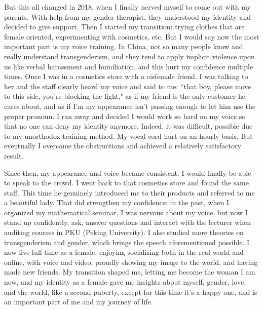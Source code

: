 \documentclass[10pt]{article}
\begin{document}
\begin{CJK*}{UTF8}{gbsn}
But this all changed in 2018, when I finally nerved myself to come out with my parents. With help from my gender therapist, they understood my identity and decided to give support. Then I started my transition: trying clothes that are female oriented, experimenting with cosmetics, etc. But I would say now the most important part is my voice training. In China, not so many people know and really understand transgenderism, and they tend to apply implicit violence upon us like verbal harassment and humiliation, and this hurt my confidence multiple times. Once I was in a cosmetics store with a cisfemale friend. I was talking to her and the staff clearly heard my voice and said to me: ``that boy, please move to this side, you're blocking the light," as if my friend is the only customer he cares about, and as if I'm my appearance isn't passing enough to let him use the proper pronoun. I ran away and decided I would work so hard on my voice so that no one can deny my identity anymore. Indeed, it was difficult, possible due to my unorthodox training method. My vocal cord hurt on an hourly basis. But eventually I overcame the obstructions and achieved a relatively satisfactory result.

Since then, my appearance and voice became consistent. I would finally be able to speak to the crowd. I went back to that cosmetics store and found the same staff. This time he genuinely introduced me to their products and referred to me a beautiful lady. That did strengthen my confidence: in the past, when I organized my mathematical seminar, I was nervous about my voice, but now I stand up confidently, ask, answer questions and interact with the lecturer when auditing courses in PKU (Peking University). I also studied more theories on transgenderism and gender, which brings the speech aforementioned possible. I now live full-time as a female, enjoying socializing both in the real world and online, with voice and video, proudly showing my image to the world, and having made new friends. My transition shaped me, letting me become the woman I am now, and my identity as a female gave me insights about myself, gender, love, and the world, like a second puberty, except for this time it's a happy one, and is an important part of me and my journey of life.


\end{CJK*}
\end{document}
